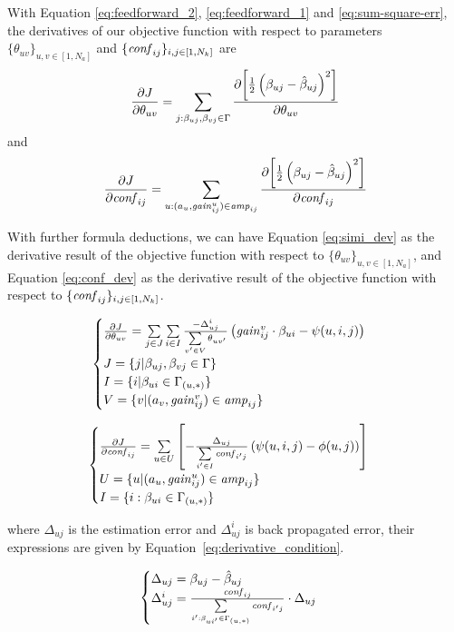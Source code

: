 With Equation \ref{eq:feedforward_2}, \ref{eq:feedforward_1} and
\ref{eq:sum-square-err}, the derivatives of our objective function
with respect to parameters $\{\theta_{uv}\}_{u,v\in[1,N_a]}$ and
$\{\mathit{conf}_{ij}\}_{i,j\in[1,N_k]}$ are
\[
\frac{\partial {J}}{\partial {\theta_{uv}}} = \sum_{j:\beta_{uj},\beta_{vj}\in\Gamma} \frac{\partial {\left[\frac{1}{2}\left(\beta_{uj}-\hat{\beta}_{uj}\right)^2\right]}}{\partial {\theta_{uv}}}
\]
and
\[
\frac{\partial {J}}{\partial {\mathit{conf}_{ij}}} = \sum_{u:(a_u,\mathit{gain}^{u}_{ij})\in\mathit{amp}_{ij}} \frac{\partial {\left[\frac{1}{2}\left(\beta_{uj}-\hat{\beta}_{uj}\right)^2\right]}}{\partial {\mathit{conf}_{ij}}}
\]

With further formula deductions, we can have Equation
\ref{eq:simi_dev} as the derivative result of the objective function
with respect to $\{\theta_{uv}\}_{u,v\in[1,N_a]}$, and Equation
\ref{eq:conf_dev} as the derivative result of the objective function
with respect to $\{\mathit{conf}_{ij}\}_{i,j\in[1,N_k]}$.

\begin{equation}
  \label{eq:simi_dev}
  \begin{cases}
    \pa{J}{\theta_{uv}}=\sum\limits_{j\in J} \sum\limits_{i\in I} \frac{-\Delta_{uj}^{i}}{\sum \limits_{v'\in V} \theta_{{u}{v'}}}  \left(\gain{v}{ij}\cdot\beta_{ui}- \psi(u,i,j)\right) \\
    J=\{j|\beta_{uj},\beta_{vj}\in\Gamma\} \\
    I=\{i|\beta_{ui}\in\Gamma_{(u,*)}\} \\
    V=\{v|(a_{v},\gain{{v}}{ij})\in \amp{ij}\}
  \end{cases}
\end{equation}

\begin{equation}
  \label{eq:conf_dev}
  \begin{cases}
    \pa{J}{\confi{ij}}=\sum\limits_{u\in U} \left[ -\frac{\Delta_{uj}}{\sum\limits_{i'\in I} \confi{{i'}{j}}} \left(\psi(u,i,j) - \phi(u,j)\right) \right] \\
    U=\{u|(a_u,\gain{u}{ij})\in\amp{ij}\} \\
    I=\{i:\beta_{{u}{i}}\in\Gamma_{({u},*)}\}
  \end{cases}
\end{equation}

where $\Delta_{uj}$ is the estimation error and $\Delta_{uj}^{i}$ is
back propagated error, their expressions are given by
Equation~\ref{eq:derivative_condition}.

\begin{equation}
  \label{eq:derivative_condition}
  \begin{cases}
    \Delta_{uj}=\beta_{uj}-\hat{\beta}_{uj}\\
    \Delta_{uj}^{i}=\frac{\confi{ij}}{\sconf{u}{i'}{j}}\cdot \Delta_{uj}
  \end{cases}
\end{equation}

